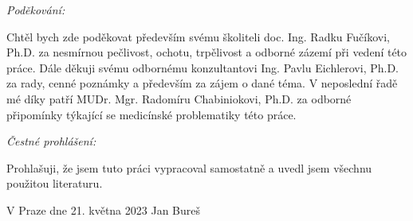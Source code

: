 \noindent \emph{\Large{}Poděkování:}{\Large\par}

\noindent Chtěl bych zde poděkovat především svému školiteli doc. Ing. Radku Fučíkovi, Ph.D.
za nesmírnou pečlivost, ochotu, trpělivost a odborné zázemí při vedení této práce. Dále děkuji svému odbornému konzultantovi Ing. Pavlu Eichlerovi, Ph.D. za rady, cenné poznámky a především za zájem o dané téma. V neposlední řadě mé díky patří MUDr. Mgr. Radomíru Chabiniokovi, Ph.D. za odborné připomínky týkající se medicínské problematiky této práce.

\vfill

\noindent \emph{\Large{}Čestné prohlášení:}{\Large\par}

\noindent Prohlašuji, že jsem tuto práci vypracoval samostatně a uvedl
jsem všechnu použitou literaturu.

\bigskip{}

\noindent V Praze dne 21. května 2023 \hfill{}Jan Bureš

\vspace{2cm}

\newpage{}